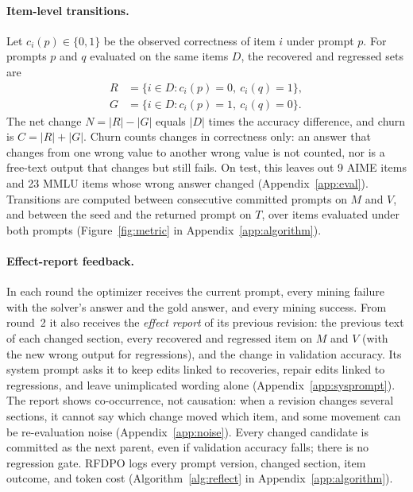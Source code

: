 \documentclass[11pt]{article}
\begin{document}
\paragraph{Item-level transitions.}
\label{sec:metric}
Let $c_i(p)\in\{0,1\}$ be the observed correctness of item $i$ under prompt $p$. For prompts $p$ and $q$ evaluated on the same items $D$, the recovered and regressed sets are
\begin{equation*}
\begin{aligned}
R&=\{i\in D:c_i(p)=0,\ c_i(q)=1\},\\
G&=\{i\in D:c_i(p)=1,\ c_i(q)=0\}.
\end{aligned}
\end{equation*}
The net change $N=|R|-|G|$ equals $|D|$ times the accuracy difference, and churn is $C=|R|+|G|$. Churn counts changes in correctness only: an answer that changes from one wrong value to another wrong value is not counted, nor is a free-text output that changes but still fails. On test, this leaves out 9 AIME items and 23 MMLU items whose wrong answer changed (Appendix~\ref{app:eval}). Transitions are computed between consecutive committed prompts on $M$ and $V$, and between the seed and the returned prompt on $T$, over items evaluated under both prompts (Figure~\ref{fig:metric} in Appendix~\ref{app:algorithm}).

\paragraph{Effect-report feedback.}
\label{sec:optimization}
In each round the optimizer receives the current prompt, every mining failure with the solver's answer and the gold answer, and every mining success. From round~2 it also receives the \emph{effect report} of its previous revision: the previous text of each changed section, every recovered and regressed item on $M$ and $V$ (with the new wrong output for regressions), and the change in validation accuracy. Its system prompt asks it to keep edits linked to recoveries, repair edits linked to regressions, and leave unimplicated wording alone (Appendix~\ref{app:sysprompt}). The report shows co-occurrence, not causation: when a revision changes several sections, it cannot say which change moved which item, and some movement can be re-evaluation noise (Appendix~\ref{app:noise}). Every changed candidate is committed as the next parent, even if validation accuracy falls; there is no regression gate. RFDPO logs every prompt version, changed section, item outcome, and token cost (Algorithm~\ref{alg:reflect} in Appendix~\ref{app:algorithm}).
\end{document}
